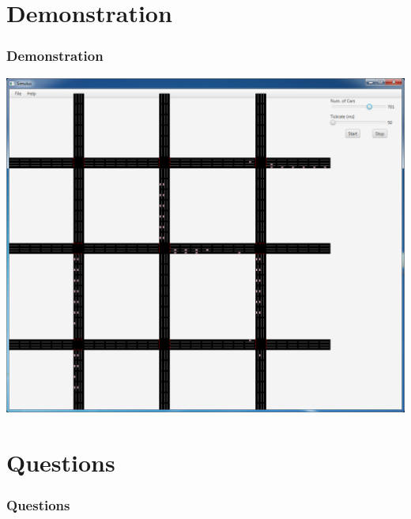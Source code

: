 \documentclass{beamer}
\begin{document}
\section{Demonstration}

\begin{frame}
\frametitle{Demonstration}
\includegraphics[scale=0.28]{screenshot}
\end{frame}

\section{Questions}

\begin{frame}
\frametitle{Questions}

\end{frame}
\end{document}
